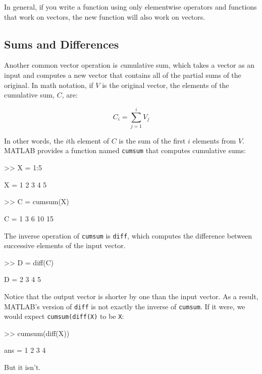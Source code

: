 In general, if you write a function using only elementwise
operators and functions that work on vectors, the new
function will also work on vectors.


\subsection{Sums and Differences}

Another common vector operation is {\emph cumulative sum}, which takes a vector as an input and computes a new vector that contains all of the partial sums of the original.  In math notation, if $V$ is the original vector, the elements of the cumulative sum, $C$, are:


\begin{equation}
C_i = \sum_{j=1}^i V_j
\end{equation}

In other words, the $i$th element of $C$ is the sum of the first
$i$ elements from $V$.  MATLAB provides a function named {\tt cumsum} that computes cumulative sums:


\begin{code}
>> X = 1:5

X = 1     2     3     4     5

>> C = cumsum(X)

C = 1     3     6    10    15
\end{code}

The inverse operation of {\tt cumsum} is {\tt diff}, which computes
the difference between successive elements of the input vector.


\begin{code}
>> D = diff(C)

D = 2     3     4     5
\end{code}

Notice that the output vector is shorter by one than the input
vector.  As a result, MATLAB's version of {\tt diff} is not
exactly the inverse of {\tt cumsum}.  If it were, we would
expect {\tt cumsum(diff(X)} to be {\tt X}:

\begin{code}
>> cumsum(diff(X))

ans = 1     2     3     4
\end{code}

But it isn't.

